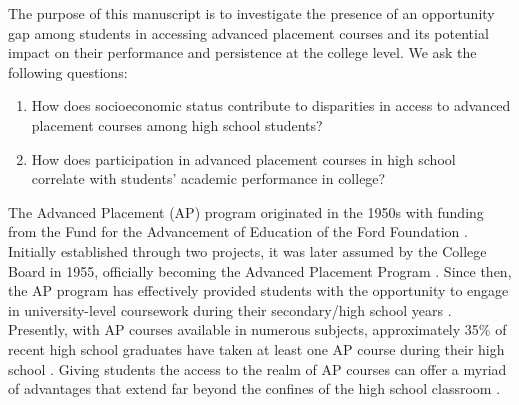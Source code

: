 \documentclass[sn-mathphys-num]{sn-jnl}%
\theoremstyle{thmstyleone}%
\theoremstyle{thmstyletwo}%
\theoremstyle{thmstylethree}%
\begin{document}
The purpose of this manuscript is to investigate the presence of an opportunity gap among students in accessing advanced placement courses and its potential impact on their performance and persistence at the college level. We ask the following questions:\\
\begin{enumerate}
    \item How does socioeconomic status contribute to disparities in access to advanced placement courses among high school students?
    \item How does participation in advanced placement courses in high school correlate with students' academic performance in college?\\
\end{enumerate}

The Advanced Placement (AP) program originated in the 1950s with funding from the Fund for the Advancement of Education of the Ford Foundation \cite{curtis2002learning, diyanni2002origins}. Initially established through two projects, it was later assumed by the College Board in 1955, officially becoming the Advanced Placement Program \cite{curtis2002learning, diyanni2002origins}. Since then, the AP program has effectively provided students with the opportunity to engage in university-level coursework during their secondary/high school years \cite{curtis2002learning, diyanni2002origins}. Presently, with AP courses available in numerous subjects, approximately 35$\%$ of recent high school graduates have taken at least one AP course during their high school \cite{apreport23}. Giving students the access to the realm of AP courses can offer a myriad of advantages that extend far beyond the confines of the high school classroom \cite{apreport}.\\ 
\end{document}
